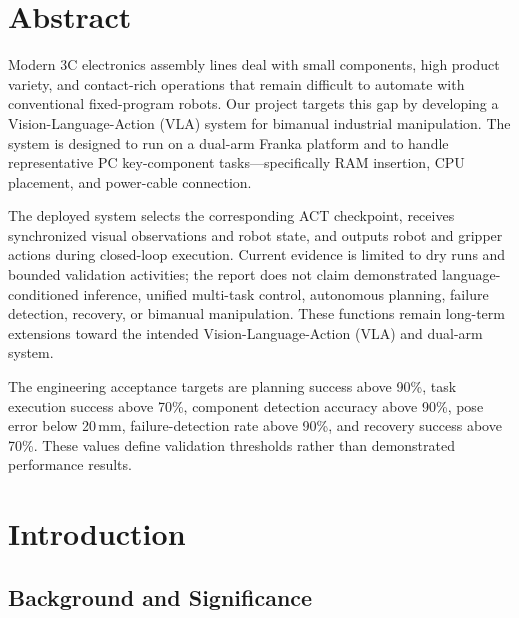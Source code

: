 \documentclass[12pt, letterpaper]{article}
\newcommand{\drone}[1]{{\color{gray}#1}}
\begin{document}
\newpage
\section*{Abstract}

\drone{Modern 3C electronics assembly lines deal with small components, high product variety, and contact-rich operations that remain difficult to automate with conventional fixed-program robots. Our project targets this gap by developing a Vision-Language-Action (VLA) system for bimanual industrial manipulation. The system is designed to run on a dual-arm Franka platform and to handle representative PC key-component tasks---specifically RAM insertion, CPU placement, and power-cable connection.}

The deployed system selects the corresponding ACT checkpoint, receives synchronized visual
  observations and robot state, and outputs robot and gripper actions during closed-loop execution.
  Current evidence is limited to dry runs and bounded validation activities; the report does not claim
  demonstrated language-conditioned inference, unified multi-task control, autonomous planning,
  failure detection, recovery, or bimanual manipulation. These functions remain long-term extensions
  toward the intended Vision-Language-Action (VLA) and dual-arm system.

  The engineering acceptance targets are planning success above 90\%, task execution success above 70\%, component detection accuracy above 90\%, pose error below 20\,mm, failure-detection rate above
  90\%, and recovery success above 70\%. These values define validation thresholds rather than
  demonstrated performance results.


\newpage
\tableofcontents
\newpage

\section{Introduction}

\subsection{Background and Significance}
\end{document}

